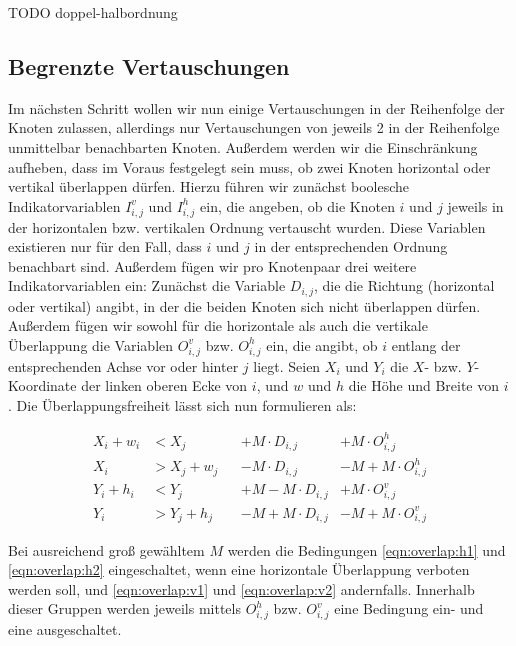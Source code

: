 TODO doppel-halbordnung

\subsection{Begrenzte Vertauschungen}
\label{sub:ilp:2}

Im nächsten Schritt wollen wir nun einige Vertauschungen in der Reihenfolge der Knoten zulassen, allerdings nur Vertauschungen von jeweils 2 in der Reihenfolge unmittelbar benachbarten Knoten. Außerdem werden wir die Einschränkung aufheben, dass im Voraus festgelegt sein muss, ob zwei Knoten horizontal oder vertikal überlappen dürfen. Hierzu führen wir zunächst boolesche Indikatorvariablen $I^{v}_{i,j}$ und $I^{h}_{i,j}$ ein, die angeben, ob die Knoten $i$ und $j$ jeweils in der horizontalen bzw. vertikalen Ordnung vertauscht wurden. Diese Variablen existieren nur für den Fall, dass $i$ und $j$ in der entsprechenden Ordnung benachbart sind. Außerdem fügen wir pro Knotenpaar drei weitere Indikatorvariablen ein: Zunächst die Variable $D_{i,j}$, die die Richtung (horizontal oder vertikal) angibt, in der die beiden Knoten sich nicht überlappen dürfen. Außerdem fügen wir sowohl für die horizontale als auch die vertikale Überlappung die Variablen $O^{v}_{i,j}$ bzw. $O^{h}_{i,j}$ ein, die angibt, ob $i$ entlang der entsprechenden Achse vor oder hinter $j$ liegt. Seien $X_i$ und $Y_i$ die $X$- bzw. $Y$-Koordinate der linken oberen Ecke von $i$, und $w$ und $h$ die Höhe und Breite von $i$. Die Überlappungsfreiheit lässt sich nun formulieren als:

\begin{align}
	X_i + w_i &< X_j &&+ M \cdot D_{i,j} &+ M \cdot O^{h}_{i,j} \label{eqn:overlap:h1}\\
	X_i &> X_j + w_j &&- M \cdot D_{i,j} &- M + M \cdot O^{h}_{i,j} \label{eqn:overlap:h2}\\
	Y_i + h_i &< Y_j &&+ M - M \cdot D_{i,j} &+ M \cdot O^{v}_{i,j} \label{eqn:overlap:v1}\\
	Y_i &> Y_j + h_j &&- M + M \cdot D_{i,j} &- M + M \cdot O^{v}_{i,j} \label{eqn:overlap:v2}
\end{align}

Bei ausreichend groß gewähltem $M$ werden die Bedingungen \ref{eqn:overlap:h1} und \ref{eqn:overlap:h2} eingeschaltet, wenn eine horizontale Überlappung verboten werden soll, und \ref{eqn:overlap:v1} und \ref{eqn:overlap:v2} andernfalls. Innerhalb dieser Gruppen werden jeweils mittels $O^{h}_{i,j}$ bzw. $O^{v}_{i,j}$ eine Bedingung ein- und eine ausgeschaltet.

